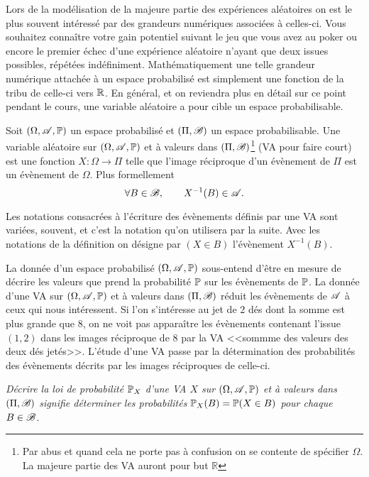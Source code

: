 \documentclass[11pt, a4paper]{article}
\begin{document}
Lors de la modélisation de la majeure partie des expériences
aléatoires on est le plus souvent intéressé par des grandeurs
numériques associées à celles-ci. Vous souhaitez connaître votre gain
potentiel suivant le jeu que vous avez au poker ou encore le premier
échec d'une expérience aléatoire n'ayant que deux issues possibles,
répétées indéfiniment. Mathématiquement une telle grandeur numérique
attachée à un espace probabilisé est simplement une fonction de la
tribu de celle-ci vers $\mathbb{R}$. En général, et on reviendra plus en
détail sur ce point pendant le cours, une variable aléatoire a pour
cible un espace probabilisable.
\begin{defn}
  Soit $(\Omega, \mathscr{A}, \operatorname{\mathbb{P}})$ un espace probabilisé et
  $(\Pi, \mathscr{B})$ un espace probabilisable. Une variable aléatoire sur
  $(\Omega, \mathscr{A}, \operatorname{\mathbb{P}})$ et à valeurs dans
  $(\Pi, \mathscr{B})$\footnote{Par abus et quand cela ne porte pas à
    confusion on se contente de spécifier $\Omega$. La majeure partie
    des VA auront pour but $\mathbb{R}$} (VA pour faire court) est une
  fonction $X : \Omega \to \Pi$ telle que l'image réciproque d'un
  évènement de $\Pi$ est un évènement de $\Omega$. Plus formellement
  \[
    \forall B \in \mathscr{B}, \qquad X^{-1}(B) \in \mathscr{A}.
  \]
\end{defn}
\begin{nota}
  Les notations consacrées à l'écriture des évènements définis par une
  VA sont variées, souvent, et c'est la notation qu'on utilisera par
  la suite. Avec les notations de la définition on désigne par
  $(X \in B)$ l'évènement $X^{-1}(B)$.
\end{nota}
La donnée d'un espace probabilisé $(\Omega, \mathscr{A}, \operatorname{\mathbb{P}})$ sous-entend
d'être en mesure de décrire les valeurs que prend la probabilité $\operatorname{\mathbb{P}}$
sur les évènements de $\operatorname{\mathbb{P}}$. La donnée d'une VA sur
$(\Omega, \mathscr{A}, \operatorname{\mathbb{P}})$ et à valeurs dans $(\Pi, \mathscr{B})$ réduit les
évènements de $\mathscr{A}$ à ceux qui nous intéressent. Si l'on
s'intéresse au jet de $2$ dés dont la somme est plus grande que $8$,
on ne voit pas apparaître les évènements contenant l'issue $(1, 2)$
dans les images réciproque de $8$ par la VA <<sommme des valeurs des
deux dés jetés>>. L'étude d'une VA passe par la détermination des
probabilités des évènements décrits par les images réciproques de
celle-ci.
\begin{center}
  \begin{minipage}{0.7\textwidth}
    \textit{
      Décrire la loi de probabilité $\operatorname{\mathbb{P}}_X$ d'une VA $X$ sur
      $(\Omega, \mathscr{A}, \operatorname{\mathbb{P}})$ et à valeurs dans $(\Pi, \mathscr{B})$ signifie
      déterminer les probabilités $\operatorname{\mathbb{P}}_X(B) = \operatorname{\mathbb{P}}(X \in B)$ pour chaque
      $B \in \mathscr{B}$.
    }
  \end{minipage}
\end{center}
\end{document}
